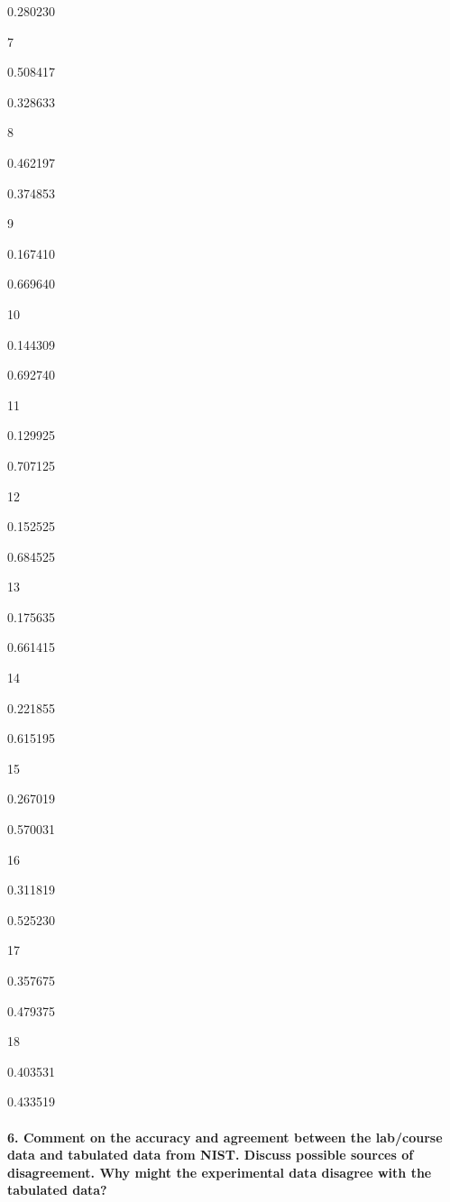 0.280230

7

0.508417

0.328633

8

0.462197

0.374853

9

0.167410

0.669640

10

0.144309

0.692740

11

0.129925

0.707125

12

0.152525

0.684525

13

0.175635

0.661415

14

0.221855

0.615195

15

0.267019

0.570031

16

0.311819

0.525230

17

0.357675

0.479375

18

0.403531

0.433519

\hypertarget{comment-on-the-accuracy-and-agreement-between-the-labcourse-data-and-tabulated-data-from-nist.-discuss-possible-sources-of-disagreement.-why-might-the-experimental-data-disagree-with-the-tabulated-data}{%
\paragraph{6. Comment on the accuracy and agreement between the
lab/course data and tabulated data from NIST. Discuss possible sources
of disagreement. Why might the experimental data disagree with the
tabulated
data?}\label{comment-on-the-accuracy-and-agreement-between-the-labcourse-data-and-tabulated-data-from-nist.-discuss-possible-sources-of-disagreement.-why-might-the-experimental-data-disagree-with-the-tabulated-data}}

